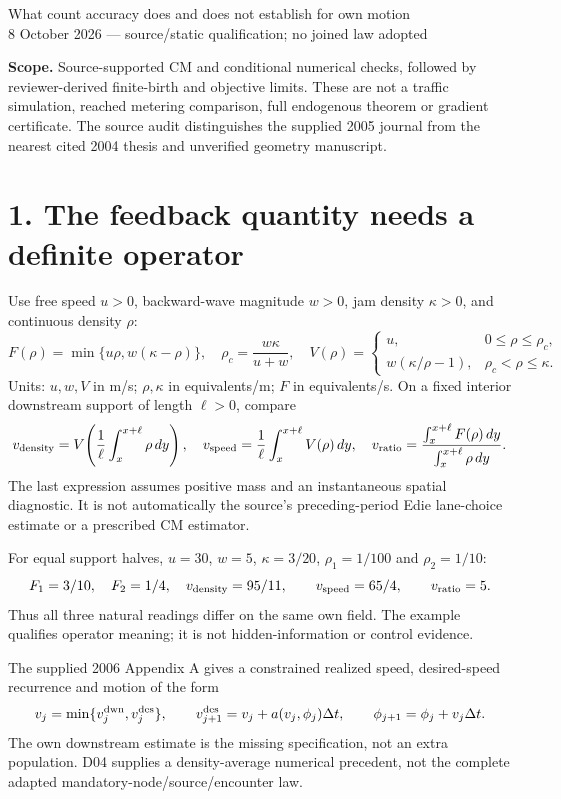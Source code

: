 \documentclass[11pt,a4paper]{article}
\begin{document}
{\Large What count accuracy does and does not establish for own motion}\\[4pt]
8 October 2026 --- source/static qualification; no joined law adopted

\textbf{Scope.} Source-supported CM and conditional numerical checks, followed
by reviewer-derived finite-birth and objective limits. These are not a traffic
simulation, reached metering comparison, full endogenous theorem or gradient
certificate. The source audit distinguishes the supplied 2005 journal from
the nearest cited 2004 thesis and unverified geometry manuscript.

\section*{1. The feedback quantity needs a definite operator}
Use free speed $u>0$, backward-wave magnitude $w>0$, jam density $\kappa>0$,
and continuous density $\rho$:
\begin{equation}
 F(\rho)=\min\{u\rho,w(\kappa-\rho)\},\quad
 \rho_c=\frac{w\kappa}{u+w},\quad
 V(\rho)=\begin{cases}u,&0\le\rho\le\rho_c,\\
 w(\kappa/\rho-1),&\rho_c<\rho\le\kappa.\end{cases}
\end{equation}
Units: $u,w,V$ in m/s; $\rho,\kappa$ in equivalents/m; $F$ in equivalents/s.
On a fixed interior downstream support of length $\ell>0$, compare
\begin{equation}
 v_{\rm density}=V\!\left(\frac1\ell\int_x^{x+\ell}\rho\,dy\right),\quad
 v_{\rm speed}=\frac1\ell\int_x^{x+\ell}V(\rho)\,dy,\quad
 v_{\rm ratio}=\frac{\int_x^{x+\ell}F(\rho)\,dy}
 {\int_x^{x+\ell}\rho\,dy}.
\end{equation}
The last expression assumes positive mass and an instantaneous spatial
diagnostic. It is not automatically the source's preceding-period Edie
lane-choice estimate or a prescribed CM estimator.

For equal support halves, $u=30$, $w=5$, $\kappa=3/20$,
$\rho_1=1/100$ and $\rho_2=1/10$:
\begin{equation}
 F_1=3/10,\quad F_2=1/4,\quad
 v_{\rm density}=95/11,\qquad v_{\rm speed}=65/4,\qquad
 v_{\rm ratio}=5.
\end{equation}
Thus all three natural readings differ on the same own field. The example
qualifies operator meaning; it is not hidden-information or control evidence.

The supplied 2006 Appendix A gives a constrained realized speed, desired-speed
recurrence and motion of the form
\begin{equation}
 v_j=\min\{v^{\rm dwn}_j,v^{\rm des}_j\},\qquad
 v^{\rm des}_{j+1}=v_j+a(v_j,\phi_j)\Delta t,\qquad
 \phi_{j+1}=\phi_j+v_j\Delta t.
\end{equation}
The own downstream estimate is the missing specification, not an extra
population. D04 supplies a density-average numerical precedent, not the
complete adapted mandatory-node/source/encounter law.
\end{document}
